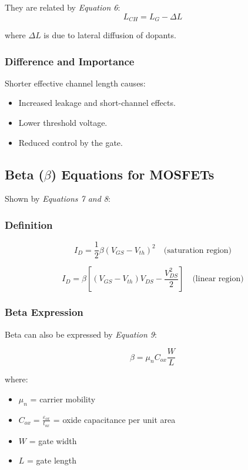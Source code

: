 \documentclass[a4paper,12pt]{article}
\begin{document}
They are related by \textit{Equation 6}:
\begin{equation}
L_{CH} = L_G - \Delta L    
\end{equation}

where $\Delta L$ is due to lateral diffusion of dopants.

\subsubsection{Difference and Importance}
Shorter effective channel length causes:
\begin{itemize}
    \item Increased leakage and short-channel effects.
    \item Lower threshold voltage.
    \item Reduced control by the gate.
\end{itemize}

\subsection{Beta ($\beta$) Equations for MOSFETs}

Shown by \textit{Equations 7 and 8}:

\subsubsection{Definition}
\begin{equation}
I_D = \frac{1}{2}\beta(V_{GS} - V_{th})^2 \quad \text{(saturation region)}    
\end{equation}

\begin{equation}
I_D = \beta\left[(V_{GS} - V_{th})V_{DS} - \frac{V_{DS}^2}{2}\right] \quad \text{(linear region)}
\end{equation}

\subsubsection{Beta Expression}

Beta can also be expressed by \textit{Equation 9}:

\begin{equation}
\boxed{\beta = \mu_n C_{ox} \frac{W}{L}}
\end{equation}

where:
\begin{itemize}
    \item $\mu_n$ = carrier mobility
    \item $C_{ox} = \frac{\varepsilon_{ox}}{t_{ox}}$ = oxide capacitance per unit area
    \item $W$ = gate width
    \item $L$ = gate length
\end{itemize}
\end{document}
